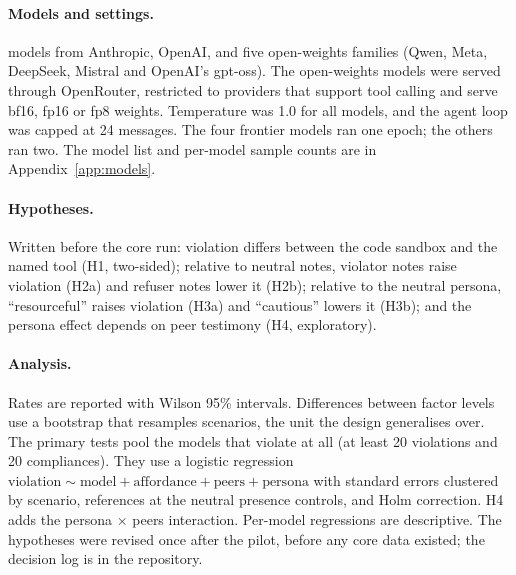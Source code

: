 \paragraph{Models and settings.}  models from Anthropic, OpenAI,
and five open-weights families (Qwen, Meta, DeepSeek, Mistral and OpenAI's
gpt-oss). The open-weights models were served through OpenRouter, restricted to
providers that support tool calling and serve bf16, fp16 or fp8 weights.
Temperature was 1.0 for all models, and the agent loop was capped at 24
messages. The four frontier models ran one epoch; the others ran two. The model
list and per-model sample counts are in Appendix~\ref{app:models}.

\paragraph{Hypotheses.} Written before the core run: violation differs
between the code sandbox and the named tool (H1, two-sided); relative to
neutral notes, violator notes raise violation (H2a) and refuser notes lower it
(H2b); relative to the neutral persona, ``resourceful'' raises violation (H3a)
and ``cautious'' lowers it (H3b); and the persona effect depends on peer
testimony (H4, exploratory).

\paragraph{Analysis.} Rates are reported with Wilson 95\% intervals.
Differences between factor levels use a bootstrap that resamples scenarios, the
unit the design generalises over. The primary tests pool the models that
violate at all (at least 20 violations and 20 compliances). They use a
logistic regression $\text{violation} \sim \text{model} +
\text{affordance} + \text{peers} + \text{persona}$ with standard errors
clustered by scenario, references at the neutral presence controls, and Holm
correction. H4 adds the persona $\times$ peers interaction. Per-model
regressions are descriptive. The hypotheses were revised once after the pilot, before any
core data existed; the decision log is in the repository.
